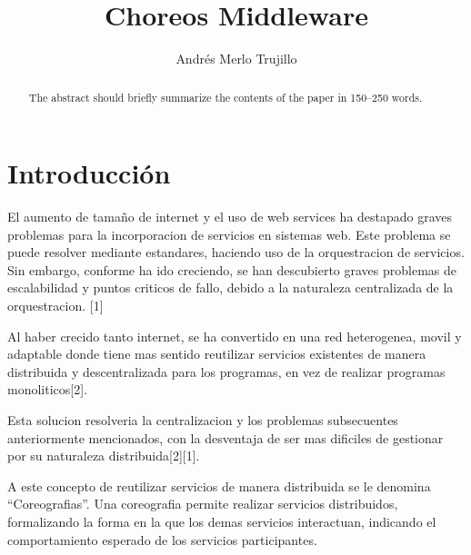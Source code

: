 \documentclass[runningheads]{llncs}
\begin{document}
%
\title{Choreos Middleware}
%
%
\author{Andrés Merlo Trujillo}
%
%
%
\maketitle              %
%
\begin{abstract}
The abstract should briefly summarize the contents of the paper in
150--250 words.

\end{abstract}
%
%
%

\section{Introducción}
El aumento de tamaño de internet y el uso de web services ha destapado graves problemas para la incorporacion de servicios en sistemas web. Este problema se puede resolver mediante estandares, haciendo uso de la orquestracion de servicios. Sin embargo, conforme ha ido creciendo, se han descubierto graves problemas de escalabilidad y puntos criticos de fallo, debido a la naturaleza centralizada de la orquestracion. [1]

Al haber crecido tanto internet, se ha convertido en una red heterogenea, movil y adaptable donde tiene mas sentido reutilizar servicios existentes de manera distribuida y descentralizada para los programas, en vez de realizar programas monoliticos[2].

Esta solucion resolveria la centralizacion y los problemas subsecuentes anteriormente mencionados, con la desventaja de ser mas dificiles de gestionar por su naturaleza distribuida[2][1].

A este concepto de reutilizar servicios de manera distribuida se le denomina ``Coreografias''. Una coreografia permite realizar servicios distribuidos, formalizando la forma en la que los demas servicios interactuan, indicando el comportamiento esperado de los servicios participantes.
\end{document}
